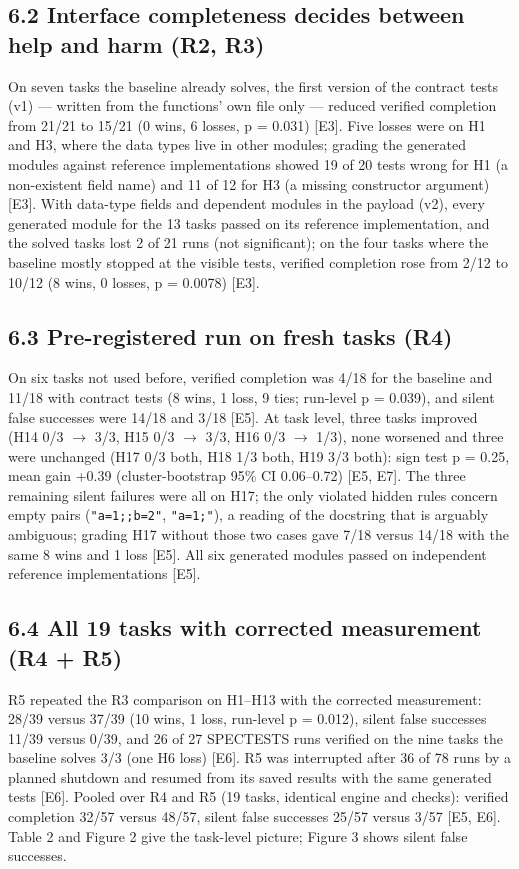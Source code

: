 \documentclass[11pt]{article}
\newcommand{\code}[1]{\texttt{#1}}
\begin{document}
\subsection*{6.2 Interface completeness decides between help and harm (R2, R3)}
On seven tasks the baseline already solves, the first version of the contract tests (v1) — written from the functions' own file only — reduced verified completion from 21/21 to 15/21 (0 wins, 6 losses, p = 0.031) [E3]. Five losses were on H1 and H3, where the data types live in other modules; grading the generated modules against reference implementations showed 19 of 20 tests wrong for H1 (a non-existent field name) and 11 of 12 for H3 (a missing constructor argument) [E3]. With data-type fields and dependent modules in the payload (v2), every generated module for the 13 tasks passed on its reference implementation, and the solved tasks lost 2 of 21 runs (not significant); on the four tasks where the baseline mostly stopped at the visible tests, verified completion rose from 2/12 to 10/12 (8 wins, 0 losses, p = 0.0078) [E3].

\subsection*{6.3 Pre-registered run on fresh tasks (R4)}
On six tasks not used before, verified completion was 4/18 for the baseline and 11/18 with contract tests (8 wins, 1 loss, 9 ties; run-level p = 0.039), and silent false successes were 14/18 and 3/18 [E5]. At task level, three tasks improved (H14 0/3 $\rightarrow$ 3/3, H15 0/3 $\rightarrow$ 3/3, H16 0/3 $\rightarrow$ 1/3), none worsened and three were unchanged (H17 0/3 both, H18 1/3 both, H19 3/3 both): sign test p = 0.25, mean gain +0.39 (cluster-bootstrap 95\% CI 0.06–0.72) [E5, E7]. The three remaining silent failures were all on H17; the only violated hidden rules concern empty pairs (\code{"a=1;;b=2"}, \code{"a=1;"}), a reading of the docstring that is arguably ambiguous; grading H17 without those two cases gave 7/18 versus 14/18 with the same 8 wins and 1 loss [E5]. All six generated modules passed on independent reference implementations [E5].

\subsection*{6.4 All 19 tasks with corrected measurement (R4 + R5)}
R5 repeated the R3 comparison on H1–H13 with the corrected measurement: 28/39 versus 37/39 (10 wins, 1 loss, run-level p = 0.012), silent false successes 11/39 versus 0/39, and 26 of 27 SPECTESTS runs verified on the nine tasks the baseline solves 3/3 (one H6 loss) [E6]. R5 was interrupted after 36 of 78 runs by a planned shutdown and resumed from its saved results with the same generated tests [E6]. Pooled over R4 and R5 (19 tasks, identical engine and checks): verified completion 32/57 versus 48/57, silent false successes 25/57 versus 3/57 [E5, E6]. Table 2 and Figure 2 give the task-level picture; Figure 3 shows silent false successes.
\end{document}
